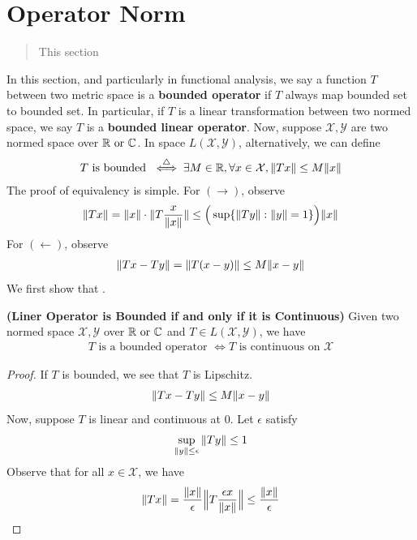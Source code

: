\documentclass{report}
\begin{document}
\section{Operator Norm}
\begin{abstract}
This section 
\end{abstract}
\begin{mdframed}
In this section, and particularly in functional analysis, we say a function $T$ between two metric space is a  \textbf{bounded operator} if $T$ always map bounded set to bounded set. In particular, if $T$ is a linear transformation between two normed space, we say $T$ is a \textbf{bounded linear operator}. Now, suppose $\mathcal{X},\mathcal{Y}$ are two normed space over $\mathbb{R}\text{ or }\mathbb{C}$. In space $L(\mathcal{X},\mathcal{Y})$, alternatively, we can define 
\begin{align*}
T\text{ is bounded } \overset{\triangle}{\iff} \exists M\in\mathbb{R},\forall x\in \mathcal{X}, \| Tx \|\leq M\| x \|
\end{align*}
The proof of equivalency is simple. For $(\longrightarrow )$, observe 
\begin{align*}
\| Tx \|= \| x \|\cdot\| T \frac{x}{\| x \|} \|\leq \Big(\sup \{ \| Ty \|:\| y \|=1 \} \Big)\| x \|
\end{align*}
For $(\longleftarrow)$, observe 
\begin{align*}
\| Tx-Ty \|=\| T(x-y) \|\leq M \| x-y \|
\end{align*}
We first show that . 
\end{mdframed}
\begin{theorem}
\label{LOB}
\textbf{(Liner Operator is Bounded if and only if it is Continuous)} Given two normed space $\mathcal{X},\mathcal{Y}$ over $\mathbb{R}\text{ or }\mathbb{C}$ and  $T\in L(\mathcal{X},\mathcal{Y})$, we have 
\begin{align*}
T\text{ is a bounded operator }\iff T\text{ is continuous on $\mathcal{X}$}
\end{align*}
\end{theorem}
\begin{proof}
If $T$ is bounded, we see that $T$ is Lipschitz. 
\begin{align*}
\| Tx-Ty \|\leq M \| x-y \|
\end{align*}
Now, suppose $T$ is linear and continuous at $0$. Let $\epsilon $ satisfy 
\begin{align*}
\sup_{\| y \|\leq \epsilon } \| Ty \| \leq 1
\end{align*}
Observe that for all $x \in \mathcal{X}$, we have
\begin{align*}
\| Tx \|= \frac{\| x \|}{\epsilon } \Big\| T \frac{\epsilon x}{\| x \|} \Big\|\leq \frac{\| x \|}{\epsilon}
\end{align*}
\end{proof}
\end{document}
